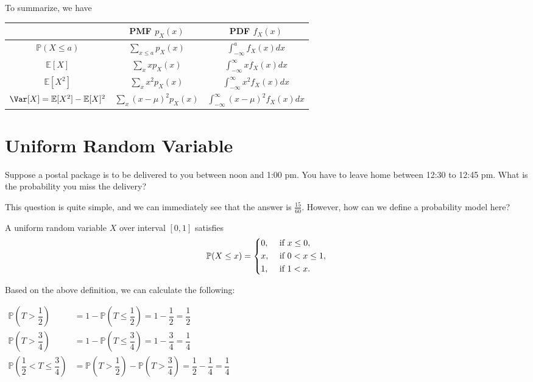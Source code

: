 To summarize, we have 
\begin{table}[H]
    \centering
    \begin{tabular}{c c c}
        \toprule
             & PMF \(p_X(x)\)  & PDF \(f_X(x)\)  \\
        \midrule
            \(\mathbb{P}(X \leq a)\)  & \(\sum_{x \leq a} p_X(x)\)  & \(\int_{-\infty}^a f_X(x)dx \)   \\[5pt]
            \(\mathbb{E}[X]\) & \(\sum_{x} xp_X(x)\) & \(\int_{-\infty}^{\infty} xf_X(x)dx \)  \\[5pt]
            \(\mathbb{E}[X^2]\) & \(\sum_{x} x^2p_X(x)\) & \(\int_{-\infty}^{\infty} x^2f_X(x)dx \)  \\[5pt]
            \(\Var[X] = \mathbb{E}[X^2] - \mathbb{E}[X]^2\) & \(\sum_{x} (x - \mu)^2 p_X(x)\)  & \(\int_{-\infty}^{\infty} (x - \mu)^2 f_X(x)dx \)  \\[5pt]
        \bottomrule
    \end{tabular}
\end{table} 

\section{Uniform Random Variable}
Suppose a postal package is to be delivered to you between noon and 1:00 pm. You have to leave home between 12:30 to 12:45 pm. What is the probability you miss the delivery?

This question is quite simple, and we can immediately see that the answer is \(\frac{15}{60}\). However, how can we define a probability model here?

\begin{definition}
    A uniform random variable \(X\) over interval \([0, 1]\) satisfies 
    \[
        \mathbb{P}(X \leq x) = \begin{dcases}
            0, &\text{ if } x \leq 0 ,\\
            x, &\text{ if } 0 < x \leq 1 ,\\
            1, &\text{ if } 1 < x.
        \end{dcases}
    \]
\end{definition}

Based on the above definition, we can calculate the following: 

\(
\begin{aligned}
    \mathbb{P}(T > \dfrac{1}{2}) &= 1 - \mathbb{P}(T \leq \dfrac{1}{2}) = 1 - \dfrac{1}{2} = \dfrac{1}{2} \\
    \mathbb{P}(T > \dfrac{3}{4}) &= 1 - \mathbb{P}(T \leq \dfrac{3}{4}) = 1 - \dfrac{3}{4} = \dfrac{1}{4} \\
    \mathbb{P}(\dfrac{1}{2} < T \leq \dfrac{3}{4}) &= \mathbb{P}(T > \dfrac{1}{2}) - \mathbb{P}(T > \dfrac{3}{4}) = \dfrac{1}{2} - \dfrac{1}{4} = \dfrac{1}{4}
\end{aligned}
\) 

